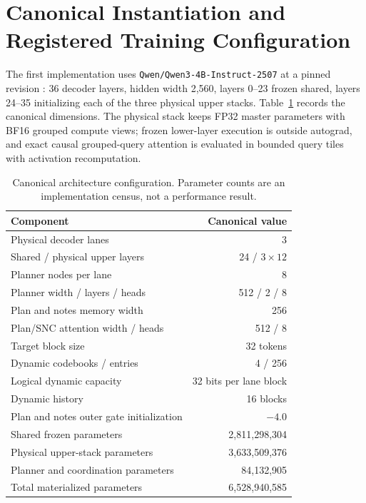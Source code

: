 \documentclass[10pt]{article}
\begin{document}
\section{Canonical Instantiation and Registered Training Configuration}
\label{app:implementation}

The first implementation uses \texttt{Qwen/Qwen3-4B-Instruct-2507} at a
pinned revision \citep{yang2025qwen3}: 36 decoder layers, hidden width
2,560, layers 0--23 frozen shared, layers 24--35 initializing each of the
three physical upper stacks. Table~\ref{tab:implementation} records the
canonical dimensions. The physical stack keeps FP32 master parameters with
BF16 grouped compute views; frozen lower-layer execution is outside
autograd, and exact causal grouped-query attention is evaluated in bounded
query tiles with activation recomputation.

\begin{table}[htbp]
\centering
\small
\begin{tabular}{lr}
\toprule
Component & Canonical value \\
\midrule
Physical decoder lanes & 3 \\
Shared / physical upper layers & 24 / \(3\times12\) \\
Planner nodes per lane & 8 \\
Planner width / layers / heads & 512 / 2 / 8 \\
Plan and notes memory width & 256 \\
Plan/SNC attention width / heads & 512 / 8 \\
Target block size & 32 tokens \\
Dynamic codebooks / entries & 4 / 256 \\
Logical dynamic capacity & 32 bits per lane block \\
Dynamic history & 16 blocks \\
Plan and notes outer gate initialization & \(-4.0\) \\
Shared frozen parameters & 2,811,298,304 \\
Physical upper-stack parameters & 3,633,509,376 \\
Planner and coordination parameters & 84,132,905 \\
Total materialized parameters & 6,528,940,585 \\
\bottomrule
\end{tabular}
\caption{Canonical architecture configuration. Parameter counts are an
implementation census, not a performance result.}
\label{tab:implementation}
\end{table}
\end{document}
